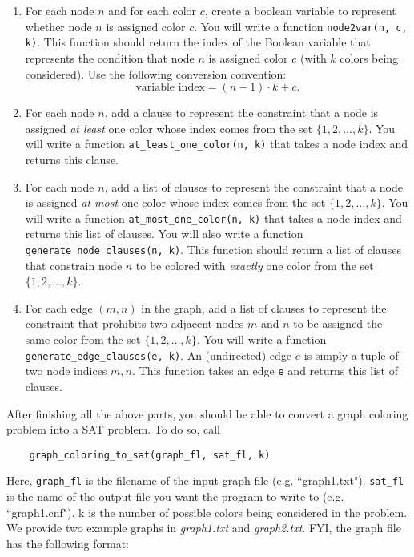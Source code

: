 \documentclass[10pt]{article}
\begin{document}
\begin{enumerate}
    \item For each node $n$ and for each color $c$, create a boolean variable to represent whether node $n$ is assigned color $c$. You will write a function \texttt{node2var(n, c, k)}. This function should return the index of the Boolean variable that represents the condition that node $n$ is assigned color $c$ (with $k$ colors being considered). Use the following conversion convention:
   \[
      \text{variable index}=(n-1)\cdot k+c.
   \]
   \item For each node $n$, add a clause to represent the constraint that a node is assigned {\em at least} one color whose index comes from the set $\{1,2,\ldots,k\}$. You will write a function \texttt{at\_least\_one\_color(n, k)} that takes a node index and returns this clause.
   \item For each node $n$, add a list of clauses to represent the constraint that a node is assigned {\em at most} one color whose index comes from the set $\{1,2,\ldots,k\}$. You will write a function \texttt{at\_most\_one\_color(n, k)} that takes a node index and returns this list of clauses. You will also write a function \texttt{generate\_node\_clauses(n, k)}. This function should return a list of clauses that constrain node $n$ to be colored with {\em exactly} one color from the set $\{1,2,…,k\}$.
   \item For each edge $(m,n)$ in the graph, add a list of clauses to represent the constraint that prohibits two adjacent nodes $m$ and $n$ to be assigned the same color from the set $\{1,2,…,k\}$.  You will write a function \texttt{generate\_edge\_clauses(e, k)}. An (undirected) edge $e$ is simply a tuple of two node indices $m, n$. This function takes an edge {\tt e} and returns this list of clauses.
\end{enumerate}

After finishing all the above parts, you should be able to convert a graph coloring problem into a SAT problem. To do so, call 

\begin{lstlisting}
    graph_coloring_to_sat(graph_fl, sat_fl, k)
\end{lstlisting}

Here, {\tt graph\_fl} is the filename of the input graph file (e.g. ``graph1.txt"). {\tt sat\_fl} is the name of the output file you want the program to write to (e.g. ``graph1.cnf"). k is the number of possible colors being considered in the problem. We provide two example graphs in {\em graph1.txt} and {\em graph2.txt}. FYI, the graph file has the following format:
\end{document}
